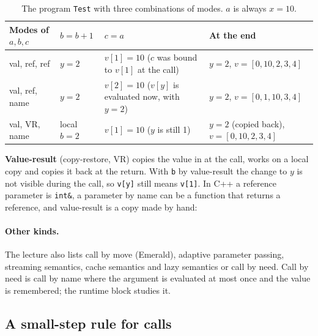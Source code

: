 \begin{table}[h]
\centering
\small
\begin{tabular}{l l >{\raggedright\arraybackslash}p{} >{\raggedright\arraybackslash}p{}}
  \toprule
  Modes of $a, b, c$ & $b = b + 1$ & $c = a$ & At the end \\
  \midrule
  val, ref, ref   & $y = 2$ & $v[1] = 10$ ($c$ was bound to $v[1]$ at the call) & $y = 2$, $v = [0,10,2,3,4]$ \\
  val, ref, name  & $y = 2$ & $v[2] = 10$ ($v[y]$ is evaluated now, with $y = 2$) & $y = 2$, $v = [0,1,10,3,4]$ \\
  val, VR, name   & local $b = 2$ & $v[1] = 10$ ($y$ is still 1) & $y = 2$ (copied back), $v = [0,10,2,3,4]$ \\
  \bottomrule
\end{tabular}
\caption{The program \texttt{Test} with three combinations of modes. $a$ is always $x = 10$.}
\label{tab:params}
\end{table}

\textbf{Value-result} (copy-restore, VR) copies the value in at the call, works on
a local copy and copies it back at the return. With \texttt{b} by value-result
the change to $y$ is not visible during the call, so \texttt{v[y]} still means
\texttt{v[1]}. In C++ a reference parameter is \texttt{int\&}, a parameter by
name can be a function that returns a reference, and value-result is a copy
made by hand:

\paragraph{Other kinds.} The lecture also lists call by move (Emerald),
adaptive parameter passing, streaming semantics, cache semantics and lazy
semantics or call by need. Call by need is call by name where the argument is
evaluated at most once and the value is remembered; the runtime block
studies it.

\subsection{A small-step rule for calls}

